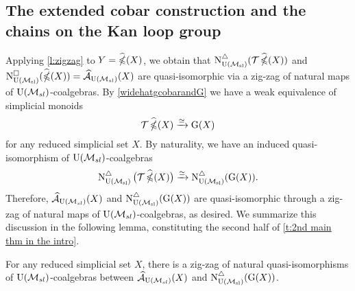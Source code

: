 \subsection{The extended cobar construction and the chains on the Kan loop group}

Applying \cref{l:zigzag} to $Y = \ccobarE(X)$, we obtain that $\schainsUSL (\mathcal{T} \ccobarE(X))$ and $\cchainsUSL(\ccobarE(X)) = \Ahat_{\USL}(X)$ are quasi-isomorphic via a zig-zag of natural maps of $\USL$-coalgebras.
By \cref{widehatgcobarandG} we have a weak equivalence of simplicial monoids
\[
\mathcal{T}\ccobarE(X) \xrightarrow{\simeq} \kan(X)
\]
for any reduced simplicial set $X$.
By naturality, we have an induced quasi-isomorphism of $\USL$-coalgebras
\[
\schainsUSL \big( \mathcal{T} \ccobarE(X) \big) \xra{\simeq}
\schainsUSL (\kan(X)).
\]
Therefore, $\Ahat_{\USL}(X)$ and $\schainsUSL(\kan(X))$ are quasi-isomorphic through a zig-zag of natural maps of $\USL$-coalgebras, as desired.
We summarize this discussion in the following lemma, constituting the second half of \cref{t:2nd main thm in the intro}.

\begin{lemma}\label{l:AhatandGX}
	For any reduced simplicial set $X$, there is a zig-zag of natural quasi-isomorphisms of $\USL$-coalgebras between $\Ahat_\USL(X)$ and $\schainsUSL(\kan(X))$.
\end{lemma}